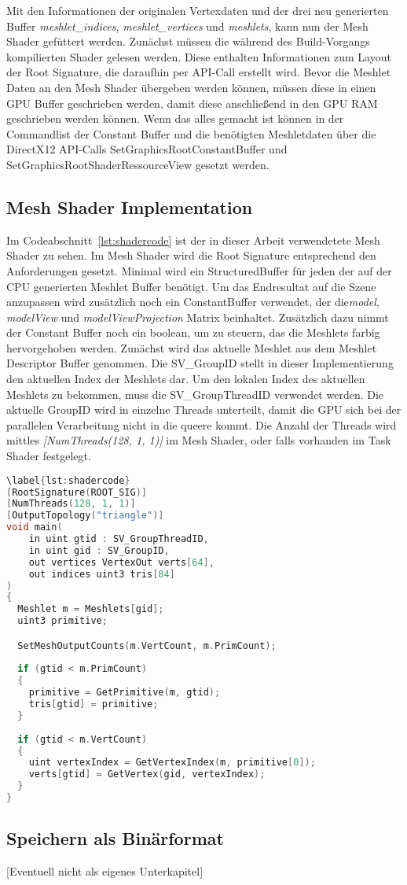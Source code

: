 Mit den Informationen der originalen Vertexdaten und der drei neu generierten Buffer \textit{meshlet\_indices}, \textit{meshlet\_vertices} und \textit{meshlets}, kann nun der Mesh Shader gefüttert werden.
Zunächst müssen die während des Build-Vorgangs kompilierten Shader gelesen werden.
Diese enthalten Informationen zum Layout der Root Signature, die daraufhin per API-Call erstellt wird.
Bevor die Meshlet Daten an den Mesh Shader übergeben werden können, müssen diese in einen GPU Buffer geschrieben werden, damit diese anschließend in den GPU RAM geschrieben werden können.
Wenn das alles gemacht ist können in der Commandlist der Constant Buffer und die benötigten Meshletdaten über die DirectX12 API-Calls SetGraphicsRootConstantBuffer und SetGraphicsRootShaderRessourceView gesetzt werden.

\subsection{Mesh Shader Implementation}
\label{subsec:mesh_shader_impl}
Im Codeabschnitt~\ref{lst:shadercode} ist der in dieser Arbeit verwendetete Mesh Shader zu sehen.
Im Mesh Shader wird die Root Signature entsprechend den Anforderungen gesetzt.
Minimal wird ein StructuredBuffer für jeden der auf der CPU generierten Meshlet Buffer benötigt.
Um das Endresultat auf die Szene anzupassen wird zusätzlich noch ein ConstantBuffer verwendet, der die\textit{model}, \textit{modelView} und \textit{modelViewProjection} Matrix beinhaltet. 
Zusätzlich dazu nimmt der Constant Buffer noch ein boolean, um zu steuern, das die Meshlets farbig hervorgehoben werden.
Zunächst wird das aktuelle Meshlet aus dem Meshlet Descriptor Buffer genommen.
Die SV\_GroupID stellt in dieser Implementierung den aktuellen Index der Meshlets dar.
Um den lokalen Index des aktuellen Meshlets zu bekommen, muss die SV\_GroupThreadID verwendet werden.
Die aktuelle GroupID wird in einzelne Threads unterteilt, damit die GPU sich bei der parallelen Verarbeitung nicht in die queere kommt.
Die Anzahl der Threads wird mittles \textit{[NumThreads(128, 1, 1)]} im Mesh Shader, oder falls vorhanden im Task Shader festgelegt.

\newpage \begin{lstlisting}[language = C++, caption = Mesh Shader Main]
\label{lst:shadercode}
[RootSignature(ROOT_SIG)]
[NumThreads(128, 1, 1)]
[OutputTopology("triangle")]
void main(
    in uint gtid : SV_GroupThreadID,
    in uint gid : SV_GroupID,
    out vertices VertexOut verts[64],
    out indices uint3 tris[84]
)
{
  Meshlet m = Meshlets[gid];
  uint3 primitive;

  SetMeshOutputCounts(m.VertCount, m.PrimCount);
  
  if (gtid < m.PrimCount)
  {
    primitive = GetPrimitive(m, gtid);
    tris[gtid] = primitive;
  }
  
  if (gtid < m.VertCount)
  {
    uint vertexIndex = GetVertexIndex(m, primitive[0]);
    verts[gtid] = GetVertex(gid, vertexIndex);
  }
}
\end{lstlisting}


\subsection{Speichern als Binärformat}
[Eventuell nicht als eigenes Unterkapitel]
